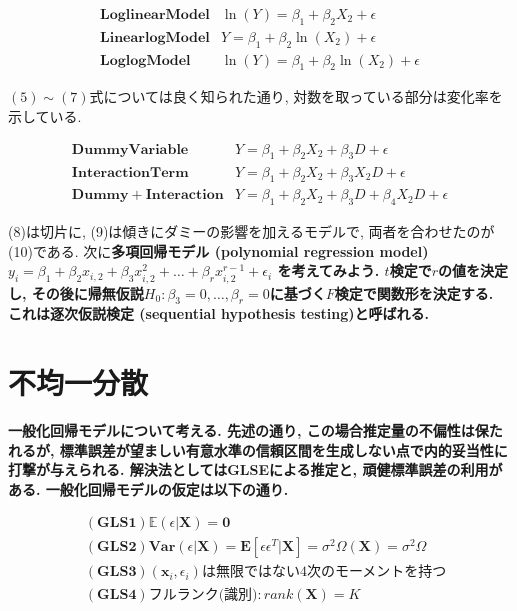 \documentclass[paper=a4paper,fontsize=10pt]{jlreq}
\begin{document}
\begin{align}
  \mathbf{Loglinear Model　}&\ln(Y)=\beta_1+\beta_2X_{2}+\epsilon\\
  \mathbf{Linearlog Model　}&Y=\beta_1+\beta_2\ln(X_{2})+\epsilon\\
  \mathbf{Loglog Model　}&\ln(Y)=\beta_1+\beta_2\ln(X_{2})+\epsilon
\end{align}

$(5) \sim (7)$式については良く知られた通り, 対数を取っている部分は変化率を示している.

\begin{align}
  \mathbf{Dummy Variable　}&Y=\beta_1+\beta_2X_{2}+\beta_3D+\epsilon\\
  \mathbf{Interaction Term　}&Y=\beta_1+\beta_2X_{2}+\beta_3X_{2}D+\epsilon\\
  \mathbf{Dummy+Interaction　}&Y=\beta_1+\beta_2X_{2}+\beta_3D+\beta_4X_{2}D+\epsilon
\end{align}

(8)は切片に, (9)は傾きにダミーの影響を加えるモデルで, 両者を合わせたのが(10)である. 次に\rmfamily\mcfamily\bfseries{多項回帰モデル (polynomial regression model)}\mdseries  $ y_i = \beta_1 + \beta_2 x_{i,2} + \beta_3 x_{i,2}^2 + \dots + \beta_r x_{i,2}^{r-1} + \epsilon_i$ を考えてみよう. $t$検定で$r$の値を決定し, その後に帰無仮説$H_0 : \beta_3 = 0, \dots, \beta_r = 0$に基づく$F$検定で関数形を決定する. これは逐次仮説検定 (sequential hypothesis testing)と呼ばれる.\\

\section{不均一分散}
\rmfamily\mcfamily\bfseries{一般化回帰モデル}\mdseries について考える. 先述の通り, この場合推定量の不偏性は保たれるが, 標準誤差が\rmfamily\mcfamily\bfseries{望ましい有意水準の信頼区間を生成しない}\mdseries 点で内的妥当性に打撃が与えられる. 解決法としてはGLSEによる推定と, 頑健標準誤差の利用がある. 一般化回帰モデルの仮定は以下の通り.

\begin{align*}
  &\mathbf{(GLS1)}　\mathbb{E}(\epsilon|\mathbf{X})=\mathbf{0}\\
  &\mathbf{(GLS2)}　\mathbf{Var}(\epsilon | \mathbf{X})=\mathbf{E}[\epsilon\epsilon^T| \mathbf{X}]=\sigma^2\Omega(\mathbf{X})=\sigma^2\Omega\\
  &\mathbf{(GLS3)}　(\mathbf{x}_{i}, \epsilon_{i})\text{は無限ではない4次のモーメントを持つ}\\
  &\mathbf{(GLS4)}　\text{フルランク(識別)}: rank(\mathbf{X})=K
\end{align*}
\end{document}
